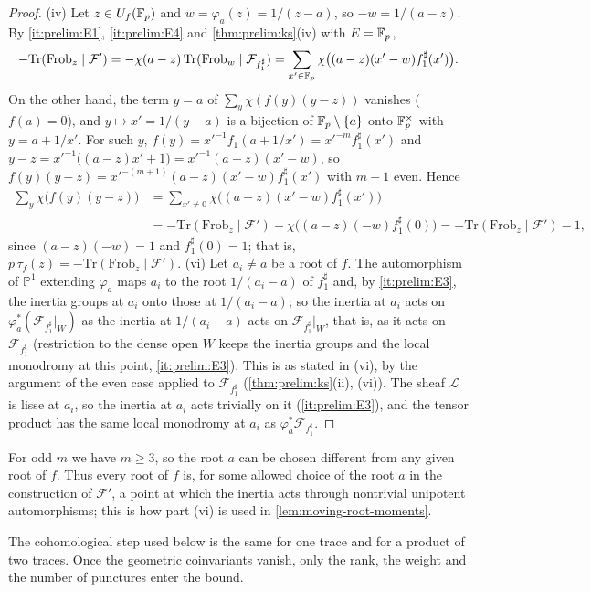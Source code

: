 \begin{proof}
(iv) Let $z\in U_f(\mathbb F_p)$ and $w=\varphi_a(z)=1/(z-a)$, so $-w=1/(a-z)$. By
\ref{it:prelim:E1}, \ref{it:prelim:E4} and \cref{thm:prelim:ks}(iv) with $E=\mathbb F_p$,
\[
  -\mathrm{Tr}(\mathrm{Frob}_z\mid\mathcal F')
  =-\chi(a-z)\,\mathrm{Tr}(\mathrm{Frob}_w\mid\mathcal F_{f_1^\sharp})
  =\sum_{x'\in\mathbb F_p}\chi\big((a-z)(x'-w)f_1^\sharp(x')\big).
\]
On the other hand, the term $y=a$ of $\sum_y\chi(f(y)(y-z))$ vanishes
($f(a)=0$), and $y\mapsto x'=1/(y-a)$ is a bijection of $\mathbb F_p\setminus\{a\}$ onto
$\mathbb F_p^\times$ with $y=a+1/x'$. For such $y$,
$f(y)=x'^{-1}f_1(a+1/x')=x'^{-m}f_1^\sharp(x')$ and
$y-z=x'^{-1}\big((a-z)x'+1\big)=x'^{-1}(a-z)(x'-w)$, so
$f(y)(y-z)=x'^{-(m+1)}(a-z)(x'-w)f_1^\sharp(x')$ with $m+1$ even. Hence
\begin{align*}
  \sum_y\chi\big(f(y)(y-z)\big)
  &=\sum_{x'\ne0}\chi\big((a-z)(x'-w)f_1^\sharp(x')\big)\\
  &=-\mathrm{Tr}(\mathrm{Frob}_z\mid\mathcal F')-\chi\big((a-z)(-w)f_1^\sharp(0)\big)
  =-\mathrm{Tr}(\mathrm{Frob}_z\mid\mathcal F')-1,
\end{align*}
since $(a-z)(-w)=1$ and $f_1^\sharp(0)=1$; that is,
$p\,\tau_f(z)=-\mathrm{Tr}(\mathrm{Frob}_z\mid\mathcal F')$.
(vi) Let $a_i\ne a$ be a root of $f$. The automorphism of $\mathbb P^1$
extending $\varphi_a$ maps $a_i$ to the root $1/(a_i-a)$ of $f_1^\sharp$ and,
by \ref{it:prelim:E3}, the inertia groups at $a_i$ onto those at $1/(a_i-a)$;
so the inertia at $a_i$ acts on $\varphi_a^*(\mathcal F_{f_1^\sharp}|_W)$ as the
inertia at $1/(a_i-a)$ acts on $\mathcal F_{f_1^\sharp}|_W$, that is, as it acts
on $\mathcal F_{f_1^\sharp}$ (restriction to the dense open $W$ keeps the
inertia groups and the local monodromy at this point, \ref{it:prelim:E3}).
This is as stated in (vi), by the argument of
the even case applied to $\mathcal F_{f_1^\sharp}$ (\cref{thm:prelim:ks}(ii),
(vi)). The sheaf $\mathcal L$ is lisse at $a_i$, so the
inertia at $a_i$ acts trivially on it (\ref{it:prelim:E3}), and the tensor
product has the same local monodromy at $a_i$ as
$\varphi_a^*\mathcal F_{f_1^\sharp}$.
\end{proof}

For odd $m$ we have $m\ge3$, so the root $a$ can be chosen different from any
given root of $f$. Thus every root of $f$ is, for some allowed
choice of the root $a$ in the construction of $\mathcal F'$, a
point at which the inertia acts through nontrivial unipotent
automorphisms; this is how part (vi) is used in
\cref{lem:moving-root-moments}.

The cohomological step used below is the same for one trace and for a product
of two traces. Once the geometric coinvariants vanish, only the rank, the
weight and the number of punctures enter the bound.

